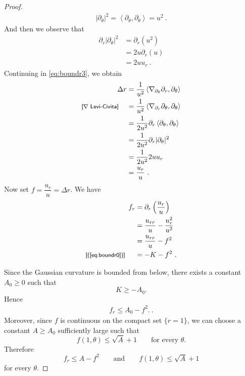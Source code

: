 \documentclass[a4paper,11pt,openright,twoside]{book}
\newcommand{\1}{\mathds{1}}
\newcommand{\commb}[1]{\textsf{{\footnotesize[#1]}}}
\newcommand{\qref}[1]{(\ref{#1})}
\theoremstyle{plain}
\theoremstyle{definition}
\theoremstyle{remark}
\begin{document}
\begin{proof}
\begin{align*}
	|\partial_\theta|^2 = \left< \partial_\theta,\partial_\theta\right> = u^2
\ . 
\end{align*}
And then we observe that
\begin{align*}
	\partial_r |\partial_\theta|^2
	&= \partial_r(u^2) \\
	&= 2u \partial_r(u)\\
	&= 2u u_r
\ . 
\end{align*}
Continuing in \eqref{eq:boundr3}, we obtain
\begin{align*}
	\Delta r &= \frac{1}{u^2}\left< \nabla_{\partial_\theta} \partial_r, \partial_\theta \right> \\
	\commb{$\nabla$ Levi-Civita}\hspace{4mm} &= \frac{1}{u^2}\left< \nabla_{\partial_r} \partial_\theta, \partial_\theta \right> \\
	&= \frac{1}{2u^2} \partial_r \left<\partial_\theta,\partial_\theta \right> \\
	&=  \frac{1}{2u^2} \partial_r |\partial_\theta|^2 \\
	&= \frac{1}{2u^2} 2u u_r  \\
	&= \frac{u_r}{u}
\ . 
\end{align*}
Now set $f= \dfrac{u_r}{u} = \Delta r$. We have
\begin{align*}
	f_r &= \partial_r \left( \frac{u_r}{u} \right) \\
	&= \frac{u_{rr}}{u} - \frac{u_r^2}{u^2} \\
	&=  \frac{u_{rr}}{u} - f^2 \\
	\commb{\qref{eq:boundr0}}\hspace{5mm}&= -K -f^2
\ . 
\end{align*}

Since the Gaussian curvature is bounded from below, there exists a constant $A_0\ge 0$ such that
\[
K\ge -A_0.
\]
Hence
\begin{align}\label{eq:boundr3a}
	f_r\le A_0-f^2.
\ . 
\end{align}
Moreover, since $f$ is continuous on the compact set $\{r=1\}$, we can choose a constant $A\ge A_0$ sufficiently large such that 
\[
f(1,\theta)\le \sqrt{A}+1
\qquad\text{for every }\theta.
\]
Therefore
\[
f_r\le A-f^2
\qquad\text{and}\qquad
f(1,\theta)\le \sqrt{A}+1
\]
for every $\theta$.


\end{proof}
\end{document}
